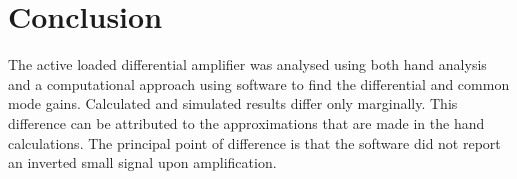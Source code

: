 \documentclass{article}
\begin{document}
\begin{figure}[H]
	
\end{figure}


\section{Conclusion}

The active loaded differential amplifier was analysed using both hand analysis and a computational approach using software to find the differential and common mode gains. Calculated and simulated results differ only marginally. This difference can be attributed to the approximations that are made in the hand calculations. The principal point of difference is that the software did not report an inverted small signal upon amplification.
\end{document}
